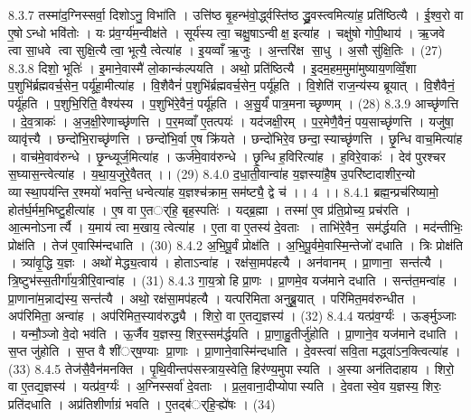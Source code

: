 8.3.7
तस्मा॑द॒ग्निस्सर्वा॒ दिशोऽनु॒ विभा॑ति । उत्ति॑ष्ठ बृ॒हन्भ॑वो॒र्द्ध्वस्ति॑ष्ठ द्ध्रु॒वस्त्वमित्या॑ह॒ प्रति॑ष्ठित्यै । ई॒श्व॒रो वा ए॒षोऽन्धो भवि॑तोः । यः प्र॑व॒र्ग्य॑म॒न्वीक्ष॑ते । सूर्य॑स्य त्वा॒ चक्षु॒षाऽन्वीक्ष॒ इत्या॑ह । चक्षु॑षो गोपी॒थाय॑ । ऋ॒जवे त्वा सा॒धवे त्वा सुक्षि॒त्यै त्वा॒ भूत्यै॒ त्वेत्या॑ह । इ॒यव्वाँ ऋ॒जुः । अ॒न्तरि॑क्ष सा॒धु । अ॒सौ सु॑क्षि॒तिः । (27)
8.3.8
दिशो॒ भूतिः॑ । इ॒माने॒वास्मै॑ लो॒कान्क॑ल्पयति । अथो॒ प्रति॑ष्ठित्यै । इ॒दम॒हम॒मुमा॑मुष्याय॒णव्विँ॒शा प॒शुभि॑र्ब्रह्मवर्च॒सेन॒ पर्यू॑हा॒मीत्या॑ह । वि॒शैवैनं॑ प॒शुभि॑र्ब्रह्मवर्च॒सेन॒ पर्यू॑हति । वि॒शेति॑ राज॒न्य॑स्य ब्रूयात् । वि॒शैवैनं॒ पर्यू॑हति । प॒शुभि॒रिति॒ वैश्य॑स्य । प॒शुभि॑रे॒वैनं॒ पर्यू॑हति । अ॒सु॒र्यं॑ पात्र॒मनाच्छृण्णम् । (28)
8.3.9
आच्छृ॑णत्ति । दे॒व॒त्राकः॑ । अ॒ज॒क्षी॒रेणाच्छृ॑णत्ति । प॒र॒मव्वाँ ए॒तत्पयः॑ । यद॑जक्षी॒रम् । प॒र॒मेणै॒वैनं॒ पय॒साच्छृ॑णत्ति । यजु॑षा॒ व्यावृ॑त्त्यै । छन्दो॑भि॒राच्छृ॑णत्ति । छन्दो॑भि॒र्वा ए॒ष क्रि॑यते । छन्दो॑भिरे॒व छन्दा॒॒स्याच्छृ॑णत्ति । छृ॒न्धि वाच॒मित्या॑ह । वाच॑मे॒वाव॑रुन्धे । छृ॒न्ध्यूर्ज॒मित्या॑ह । ऊर्ज॑मे॒वाव॑रुन्धे । छृ॒न्धि ह॒विरित्या॑ह । ह॒विरे॒वाकः॑ । देव॑ पुरश्चर स॒घ्यास॒न्त्वेत्या॑ह । य॒था॒य॒जुरे॒वैतत् ।। (29)
8.4.0
द॒धा॒ती॒वान्वा॑ह य॒ज्ञस्या॑है॒ष उ॒परि॑ष्टादाशीर॒न्यो व्यास्था॒पय॑न्ति र॒श्मयो॑ भवन्ति॒ धन्वेत्या॑ह य॒ज्ञश्च॑क्राम॒ सम॑ष्ट्यै॒ द्वे च॑ ।। 4 ।।
8.4.1
ब्रह्म॒न्प्रच॑रिष्यामो॒ होत॑र्घ॒र्मम॒भिष्टु॒हीत्या॑ह । ए॒ष वा ए॒तर््हि॒ बृह॒स्पतिः॑ । यद्ब्र॒ह्मा । तस्मा॑ ए॒व प्र॑ति॒प्रोच्य॒ प्रच॑रति । आ॒त्मनोऽनार्त्यै । य॒माय॑ त्वा म॒खाय॒ त्वेत्या॑ह । ए॒ता वा ए॒तस्य॑ दे॒वताः । ताभि॑रे॒वैन॒॒ सम॑र्द्धयति । मद॑न्तीभिः॒ प्रोक्ष॑ति । तेज॑ ए॒वास्मि॑न्दधाति । (30)
8.4.2
अ॒भि॒पू॒र्वं प्रोक्ष॑ति । अ॒भि॒पू॒र्वमे॒वास्मि॒न्तेजो॑ दधाति । त्रिः प्रोक्ष॑ति । त्र्या॑वृ॒द्धि य॒ज्ञः । अथो॑ मेद्ध्य॒त्वाय॑ । होताऽन्वा॑ह । रक्ष॑सा॒मप॑हत्यै । अन॑वानम् । प्रा॒णाना॒॒ सन्त॑त्यै । त्रि॒ष्टुभ॑स्स॒तीर्गा॑य॒त्रीरि॒वान्वा॑ह । (31)
8.4.3
गा॒य॒त्रो हि प्रा॒णः । प्रा॒णमे॒व यज॑माने दधाति । सन्त॑त॒मन्वा॑ह । प्रा॒णाना॑म॒न्नाद्य॑स्य॒ सन्त॑त्यै । अथो॒ रक्ष॑सा॒मप॑हत्यै । यत्परि॑मिता अनुब्रू॒यात् । परि॑मित॒मव॑रुन्धीत । अप॑रिमिता॒ अन्वा॑ह । अप॑रिमित॒स्याव॑रुद्ध्यै । शिरो॒ वा ए॒तद्य॒ज्ञस्य॑ । (32)
8.4.4
यत्प्र॑व॒र्ग्यः॑ । ऊर्ङ्मुञ्जाः । यन्मौ॒ञ्जो वे॒दो भव॑ति । ऊ॒र्जैव य॒ज्ञस्य॒ शिर॒स्सम॑र्द्धयति । प्रा॒णा॒हु॒तीर्जु॑होति । प्रा॒णाने॒व यज॑माने दधाति । स॒प्त जु॑होति । स॒प्त वै शी॑र््ष॒ण्याः प्रा॒णाः । प्रा॒णाने॒वास्मि॑न्दधाति । दे॒वस्त्वा॑ सवि॒ता मद्ध्वा॑ऽन॒क्त्वित्या॑ह । (33)
8.4.5
तेज॑सै॒वैन॑मनक्ति । पृ॒थि॒वीन्तप॑सस्त्राय॒स्वेति॒ हिर॑ण्य॒मुपास्यति । अ॒स्या अन॑तिदाहाय । शिरो॒ वा ए॒तद्य॒ज्ञस्य॑ । यत्प्र॑व॒र्ग्यः॑ । अ॒ग्निस्सर्वा॑ दे॒वताः । प्र॒ल॒वाना॒दीप्योपास्यति । दे॒वतास्वे॒व य॒ज्ञस्य॒ शिरः॒ प्रति॑दधाति । अप्र॑तिशीर्णाग्रं भवति । ए॒तद्ब॑र््हि॒ऱ्ह्ये॑षः । (34)
